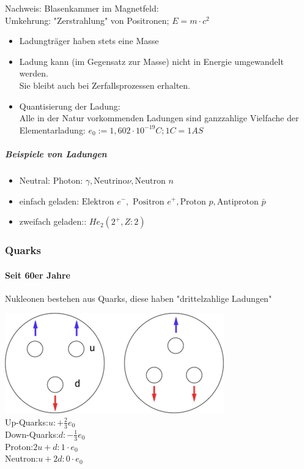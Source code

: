 \documentclass[11pt]{article}
\begin{document}
				\newpage
				
				\noindent Nachweis: Blasenkammer im Magnetfeld:  \hfill \\
				Umkehrung: "Zerstrahlung" von Positronen; $E=m\cdot c^2$
				\begin{itemize}
					\item Ladungtr\"{a}ger haben stets eine Masse
					\item Ladung kann (im Gegensatz zur Masse) nicht in Energie umgewandelt werden. \\
					      Sie bleibt auch bei Zerfallsprozessen erhalten.
					\item Quantisierung der Ladung:\\
						Alle in der Natur vorkommenden Ladungen sind ganzzahlige Vielfache der Elementarladung: $e_0:=1,602\cdot10^{-19}C; 1C=1AS$
				\end{itemize}
				\subparagraph{Beispiele von Ladungen}
				\begin{itemize}
					\item Neutral: $\text{Photon: }\gamma, \text{Neutrino}\nu, \text{Neutron }n$
					\item einfach geladen: $\text{Elektron }e^-,\text{ Positron } e^+, \text{Proton }p, \text{Antiproton }\bar{p}$
					\item zweifach geladen:: $He_2(2^+,Z:2)$
				\end{itemize}	
				

\subsubsection{Quarks }	
\paragraph{Seit 60er Jahre}
Nukleonen bestehen aus Quarks, diese haben "drittelzahlige Ladungen"

\includegraphics{skizzen/14/14_1B5}
\\
Up-Quarks:$u:+\frac{2}{3	}e_0$
\\
Down-Quarks:$d:-\frac{1}{3}e_0$
\\
Proton:$2u+d: 1\cdot e_0$
\\
Neutron:$u+2d: 0\cdot e_0$
\\
\end{document}

